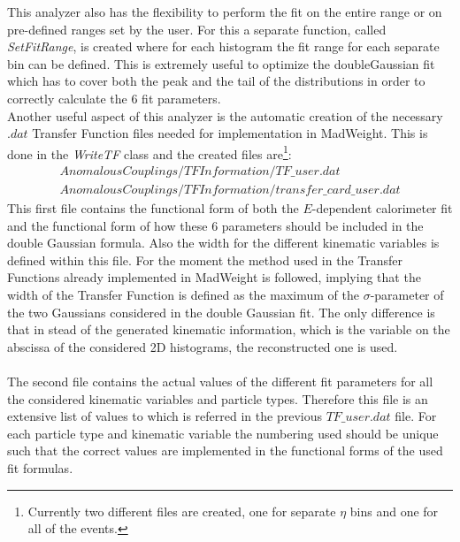 This analyzer also has the flexibility to perform the fit on the entire range or on pre-defined ranges set by the user. For this a separate function, called \textit{SetFitRange}, is created where for each histogram the fit range for each separate bin can be defined. This is extremely useful to optimize the doubleGaussian fit which has to cover both the peak and the tail of the distributions in order to correctly calculate the $6$ fit parameters.\\
Another useful aspect of this analyzer is the automatic creation of the necessary $.dat$ Transfer Function files needed for implementation in MadWeight. This is done in the \textit{WriteTF} class and the created files are\footnote{Currently two different files are created, one for separate $\eta$ bins and one for all of the events.}:
\begin{eqnarray*}
 AnomalousCouplings/TFInformation/TF\_user.dat \\
 AnomalousCouplings/TFInformation/transfer\_card\_user.dat
\end{eqnarray*}
This first file contains the functional form of both the $E$-dependent calorimeter fit and the functional form of how these $6$ parameters should be included in the double Gaussian formula. Also the width for the different kinematic variables is defined within this file. For the moment the method used in the Transfer Functions already implemented in MadWeight is followed, implying that the width of the Transfer Function is defined as the maximum of the $\sigma$-parameter of the two Gaussians considered in the double Gaussian fit. The only difference is that in stead of the generated kinematic information, which is the variable on the abscissa of the considered 2D histograms, the reconstructed one is used.\\
\\
The second file contains the actual values of the different fit parameters for all the considered kinematic variables and particle types. Therefore this file is an extensive list of values to which is referred in the previous $TF\_user.dat$ file. For each particle type and kinematic variable the numbering used should be unique such that the correct values are implemented in the functional forms of the used fit formulas.


